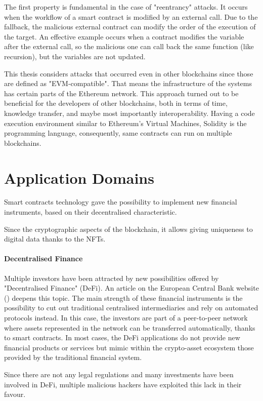 The first property is fundamental in the case of "reentrancy" attacks. 
It occurs when the workflow of a smart contract is modified by an external call. 
Due to the fallback, the malicious external contract can modify the order of the execution of the target. 
An effective example occurs when a contract modifies the variable after the external call, so the malicious one can call back the same function (like recursion), 
but the variables are not updated. 

This thesis considers attacks that occurred even in other blockchains since those are defined as "EVM-compatible". 
That means the infrastructure of the systems has certain parts of the Ethereum network. 
This approach turned out to be beneficial for the developers of other blockchains, both in terms of time, knowledge transfer, and maybe most importantly interoperability. 
Having a code execution environment similar to Ethereum's Virtual Machines, Solidity is the programming language, 
consequently, same contracts can run on multiple blockchains.

\section{Application Domains}


Smart contracts technology gave the possibility to implement new financial instruments, 
based on their decentralised characteristic. 

Since the cryptographic aspects of the blockchain, it allows giving uniqueness to digital data thanks to the NFTs.

\paragraph{Decentralised Finance} Multiple investors have been attracted by new possibilities offered by "Decentralised Finance" (DeFi).
An article on the European Central Bank website (\cite{DeFiDef}) deepens this topic. The main strength of these financial instruments is the possibility to cut out traditional centralised intermediaries and rely on automated protocols instead. 
In this case, the investors are part of a peer-to-peer network where assets represented in the network can be transferred automatically, thanks to smart contracts.
In most cases, the DeFi applications do not provide new financial products or services but mimic within the crypto-asset ecosystem those provided by the traditional financial system.

Since there are not any legal regulations and many investments have been involved in DeFi, multiple malicious hackers have exploited this lack in their favour.

